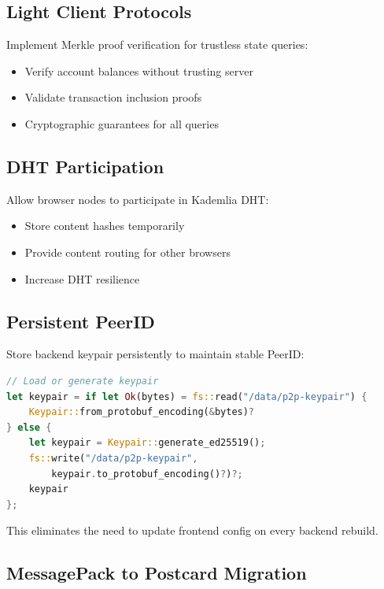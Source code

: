 \documentclass[11pt,a4paper]{article}
\begin{document}
\subsection{Light Client Protocols}

Implement Merkle proof verification for trustless state queries:

\begin{itemize}
    \item Verify account balances without trusting server
    \item Validate transaction inclusion proofs
    \item Cryptographic guarantees for all queries
\end{itemize}

\subsection{DHT Participation}

Allow browser nodes to participate in Kademlia DHT:

\begin{itemize}
    \item Store content hashes temporarily
    \item Provide content routing for other browsers
    \item Increase DHT resilience
\end{itemize}

\subsection{Persistent PeerID}

Store backend keypair persistently to maintain stable PeerID:

\begin{lstlisting}[language=Rust]
// Load or generate keypair
let keypair = if let Ok(bytes) = fs::read("/data/p2p-keypair") {
    Keypair::from_protobuf_encoding(&bytes)?
} else {
    let keypair = Keypair::generate_ed25519();
    fs::write("/data/p2p-keypair",
        keypair.to_protobuf_encoding()?)?;
    keypair
};
\end{lstlisting}

This eliminates the need to update frontend config on every backend rebuild.

\subsection{MessagePack to Postcard Migration}
\end{document}
